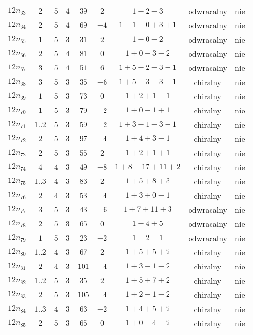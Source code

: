\begin{longtable}{ccccccccc}
$12n_{63}$ & $2$ & $5$ & $4$ & $39$ & $2$ & $1-2-3$ & odwracalny & nie \\
$12n_{64}$ & $2$ & $5$ & $4$ & $69$ & $-4$ & $1-1+0+3+1$ & odwracalny & nie \\
$12n_{65}$ & $1$ & $5$ & $3$ & $31$ & $2$ & $1+0-2$ & odwracalny & nie \\
$12n_{66}$ & $2$ & $5$ & $4$ & $81$ & $0$ & $1+0-3-2$ & odwracalny & nie \\
$12n_{67}$ & $3$ & $5$ & $4$ & $51$ & $6$ & $1+5+2-3-1$ & odwracalny & nie \\
$12n_{68}$ & $3$ & $5$ & $3$ & $35$ & $-6$ & $1+5+3-3-1$ & chiralny & nie \\
$12n_{69}$ & $1$ & $5$ & $3$ & $73$ & $0$ & $1+2+1-1$ & chiralny & nie \\
$12n_{70}$ & $1$ & $5$ & $3$ & $79$ & $-2$ & $1+0-1+1$ & chiralny & nie \\
$12n_{71}$ & $1..2$ & $5$ & $3$ & $59$ & $-2$ & $1+3+1-3-1$ & chiralny & nie \\
$12n_{72}$ & $2$ & $5$ & $3$ & $97$ & $-4$ & $1+4+3-1$ & chiralny & nie \\
$12n_{73}$ & $2$ & $5$ & $3$ & $55$ & $2$ & $1+2+1+1$ & chiralny & nie \\
$12n_{74}$ & $4$ & $4$ & $3$ & $49$ & $-8$ & $1+8+17+11+2$ & chiralny & nie \\
$12n_{75}$ & $1..3$ & $4$ & $3$ & $83$ & $2$ & $1+5+8+3$ & chiralny & nie \\
$12n_{76}$ & $2$ & $4$ & $3$ & $53$ & $-4$ & $1+3+0-1$ & chiralny & nie \\
$12n_{77}$ & $3$ & $5$ & $3$ & $43$ & $-6$ & $1+7+11+3$ & odwracalny & nie \\
$12n_{78}$ & $2$ & $5$ & $3$ & $65$ & $0$ & $1+4+5$ & odwracalny & nie \\
$12n_{79}$ & $1$ & $5$ & $3$ & $23$ & $-2$ & $1+2-1$ & odwracalny & nie \\
$12n_{80}$ & $1..2$ & $4$ & $3$ & $67$ & $2$ & $1+5+5+2$ & chiralny & nie \\
$12n_{81}$ & $2$ & $4$ & $3$ & $101$ & $-4$ & $1+3-1-2$ & chiralny & nie \\
$12n_{82}$ & $1..2$ & $5$ & $3$ & $35$ & $2$ & $1+5+7+2$ & chiralny & nie \\
$12n_{83}$ & $2$ & $5$ & $3$ & $105$ & $-4$ & $1+2-1-2$ & chiralny & nie \\
$12n_{84}$ & $1..3$ & $4$ & $3$ & $63$ & $-2$ & $1+4+5+2$ & chiralny & nie \\
$12n_{85}$ & $2$ & $5$ & $3$ & $65$ & $0$ & $1+0-4-2$ & chiralny & nie \\

\end{longtable}
